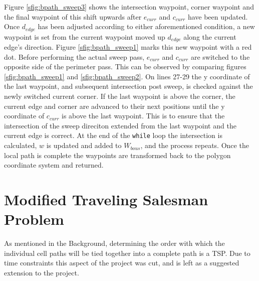 Figure \ref{sfig:bpath_sweep3} shows the intersection waypoint, corner waypoint and the final waypoint of this shift upwards after $e_{curr}$ and $c_{curr}$ have been updated.
Once $d_{edge}$ has been adjusted according to either aforementioned condition, a new waypoint is set from the current waypoint moved up $d_{edge}$ along the current edge's direction.
Figure \ref{sfig:bpath_sweep1} marks this new waypoint with a red dot.
Before performing the actual sweep pass, $e_{curr}$ and $c_{curr}$ are switched to the opposite side of the perimeter pass.
This can be observed by comparing figures \ref{sfig:bpath_sweep1} and \ref{sfig:bpath_sweep2}.
On lines 27-29 the y coordinate of the last waypoint, and subsequent intersection post sweep, is checked against the newly switched current corner.
If the last waypoint is above the corner, the current edge and corner are advanced to their next positions until the y coordinate of $c_{curr}$ is above the last waypoint.
This is to ensure that the intersection of the sweep direciton extended from the last waypoint and the current edge is correct.
At the end of the \verb|while| loop the intersection is calculated, $w$ is updated and added to $W_{bous}$, and the process repeats.
Once the local path is complete the waypoints are transformed back to the polygon coordinate system and returned.

\section{Modified Traveling Salesman Problem}
As mentioned in the Background, determining the order with which the individual cell paths will be tied together into a complete path is a TSP.
Due to time constraints this aspect of the project was cut, and is left as a suggested extension to the project.

